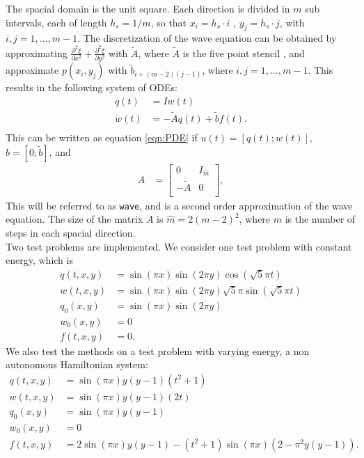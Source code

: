 \noindent The spacial domain is the unit square. Each direction is divided in $m$ sub intervals, each of length $h_s = 1/m$, so that $x_i  = h_s\cdot i$ , $y_j = h_s\cdot j$, with $i,j = 1,\dots,m-1$. 
\noindent The discretization of the wave equation can be obtained by approximating $\frac{\partial^2 \xi}{\partial x^2}+ \frac{\partial^2 \xi}{\partial y^2}$ with $\tilde{A}$, where $\tilde{A}$ is the five point stencil \cite{fivepoint}, and approximate $p(x_i,y_j)$ with $\tilde{b}_{i+(m-2)(j-1)}$, where $i,j = 1,\dots,m-1$. This results in the following system of ODEs:
\begin{equation*}
\begin{aligned}
\dot{q}(t) &= I w(t) \\
\dot{w}(t) & = -\tilde{A} q(t) + \tilde{b} f(t). \\
\end{aligned}
\end{equation*}
This can be written as equation \eqref{eqn:PDE} if $u(t) = [q(t);w(t)]$, $ b =[0; \tilde{b}] $, and
\begin{equation*}
\begin{aligned}
A &= 
\begin{bmatrix}
 0 & I_{\hat{m}} \\ - \tilde{A} & 0 \\
\end{bmatrix},
\end{aligned}
\end{equation*}
This will be referred to as \texttt{wave}, and is a second order approximation of the wave equation. The size of the matrix $A$ is $\hat{m} = 2(m-2)^2$, where $m$ is the number of steps in each spacial direction. \\

\noindent Two test problems are implemented. 
We consider one test problem with constant energy, which is
\begin{equation*}
\begin{aligned}
q(t,x,y) &= \sin(\pi x) \sin( 2 \pi y) \cos(\sqrt{5} \pi t) \\
w (t,x,y) &= \sin(\pi x) \sin( 2 \pi y) \sqrt{5} \pi \sin(\sqrt{5} \pi t) \\
q_0(x,y) &= \sin( \pi x) \sin(2 \pi y) \\
w_0(x,y) & = 0 \\
f(t,x,y) &= 0 .
\end{aligned}
\end{equation*}
We also test the methods on a test problem with varying energy, a non autonomous Hamiltonian system:
\begin{equation*}
\begin{aligned}
q(t,x,y) &= \sin(\pi x) y (y-1) (t^2+1) \\
w(t,x,y) &= \sin(\pi x) y (y-1) (2 t) \\
q_0(x,y) &= \sin(\pi x) y (y-1) \\
w_0(x,y) & = 0 \\
f(t,x,y) & = 2  \sin(\pi x) y (y-1) -(t^2+1) \sin(\pi x) (2-\pi^2 y (y-1)).
\end{aligned}
\end{equation*}

